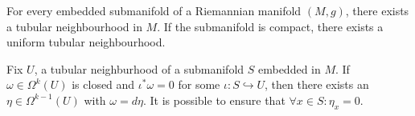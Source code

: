 \begin{theorem} \label{extub} \cite{lee2}
For every embedded submanifold of a Riemannian manifold $(M,g)$, there exists a tubular neighbourhood in $M$. If the submanifold is compact, there exists a uniform tubular neighbourhood.
\end{theorem}

\begin{proposition} \label{homoform} \cite{ana}
Fix $U$, a tubular neighburhood of a submanifold $S$ embedded in $M$. If $\omega \in \Omega^k(U)$ is closed and $\iota^* \omega = 0$ for some $\iota : S \hookrightarrow U$, then there exists an $\eta \in \Omega^{k-1}(U)$ with $\omega = d\eta$. It is possible to ensure that $\forall x \in S: \eta_x = 0$.
\end{proposition}

